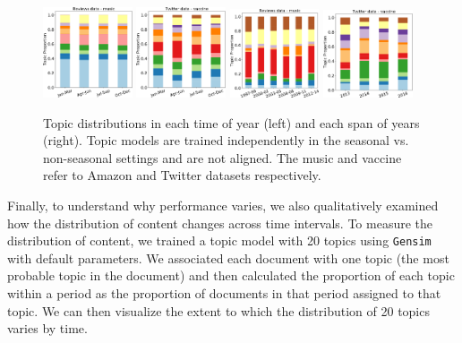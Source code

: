 \begin{figure}
\centering
\includegraphics[width=0.235\textwidth]{images/chapter3/acl2018/topic_amazon_month.pdf}
\includegraphics[width=0.235\textwidth]{images/chapter3/acl2018/topic_vaccine_month.pdf} 
\quad
\includegraphics[width=0.235\textwidth]{images/chapter3/acl2018/topic_amazon_year.pdf}
\includegraphics[width=0.235\textwidth]{images/chapter3/acl2018/topic_vaccine_year.pdf}
\caption{\label{chap3:fig:topic} Topic distributions in each time of year (left) and each span of years (right). Topic models are trained independently in the seasonal vs. non-seasonal settings and are not aligned. The music and vaccine refer to Amazon and Twitter datasets respectively.}
\end{figure}

Finally, to understand why performance varies, we also qualitatively examined how the distribution of content changes across time intervals.
To measure the distribution of content, we trained a topic model with 20 topics using \texttt{Gensim}~\cite{rehurek2010software} with default parameters.
We associated each document with one topic (the most probable topic in the document) and then calculated the proportion of each topic within a period as the proportion of documents in that period assigned to that topic.
We can then visualize the extent to which the distribution of 20 topics varies by time.

